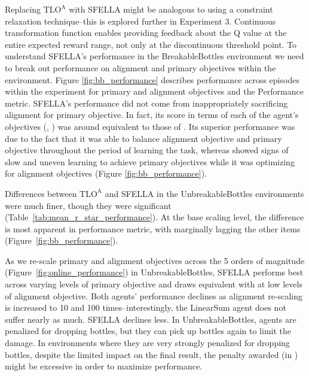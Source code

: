 Replacing $\text{TLO}^\text{A}$ with SFELLA might be analogous to using a constraint relaxation technique--this is explored further in Experiment 3. %
Continuous transformation function enables providing feedback about the \RA{} Q value at the entire expected reward range, not only at the discontinuous threshold point.
To understand SFELLA's performance in the BreakableBottles environment we need to break out performance on alignment and primary objectives within the environment. Figure \ref{fig:bb_performance} describes performance across episodes within the experiment for primary and alignment objectives and the Performance metric. SFELLA's performance did not come from inappropriately sacrificing alignment for primary objective. In fact, its score in terms of each of the agent's objectives (\RP{}, \RA{}) was around equivalent to those of \tloA{}. Its superior \RStar{} performance was due to the fact that it was able to balance alignment objective and primary objective throughout the period of learning the task, whereas \tloA{} showed signs of slow and uneven learning to achieve primary objectives while it was optimizing for alignment objectives (Figure \ref{fig:bb_performance}).

Differences between $\text{TLO}^\text{A}$ and SFELLA in the UnbreakableBottles environments were much finer, though they were significant (Table~\ref{tab:mean_r_star_performance}). At the base scaling level, the difference is most apparent in performance metric, with \tloA{} marginally lagging the other items (Figure~\ref{fig:bb_performance}). 

As we re-scale primary and alignment objectives across the 5 orders of magnitude (Figure~\ref{fig:online_performance}) in UnbreakableBottles, SFELLA performs best across varying levels of primary objective and draws equivalent with \tloA{} at low levels of alignment objective. Both agents' performance declines as alignment re-scaling is increased to 10 and 100 times--interestingly, the LinearSum agent does not suffer nearly as much. SFELLA declines less. In UnbreakableBottles, agents are penalized for dropping bottles, but they can pick up bottles again to limit the damage. In environments where they are very strongly penalized for dropping bottles, despite the limited impact on the final result, the penalty awarded (in \RP{}) might be excessive in order to maximize \RStar{} performance.

